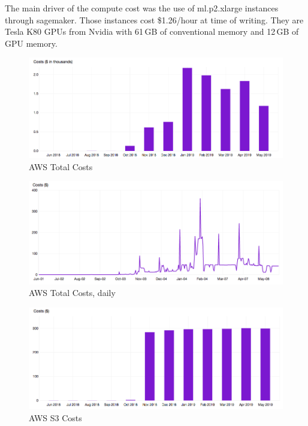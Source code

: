 The main driver of the compute cost was the use of ml.p2.xlarge instances through sagemaker. Those instances cost \$1.26/hour at time of writing. They are Tesla K80 GPUs from Nvidia with 61\,GB of conventional memory and 12\,GB of GPU memory.


\begin{figure}[!hbtp]
\includegraphics[width=\textwidth]{images/aws-metrics/total-cost.png}
\caption{AWS Total Costs\label{fg:awstotal}}
\end{figure}

\begin{figure}[!hbtp]
\includegraphics[width=\textwidth]{images/aws-metrics/total-cost-daily.png}
\caption{AWS Total Costs, daily\label{fg:awstotal}}
\end{figure}

\begin{figure}[!hbtp]
\includegraphics[width=\textwidth]{images/aws-metrics/s3-costs.png}
\caption{AWS S3 Costs\label{fg:awstotal}}
\end{figure}

